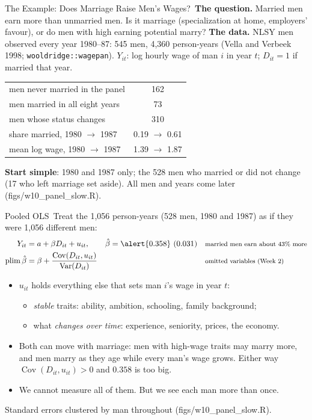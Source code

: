 \documentclass[aspectratio=169,11pt,xcolor=dvipsnames]{beamer}
\newcommand{\srcp}[1]{{\scriptsize\color{gray}(#1)}}
\DeclareMathOperator{\Cov}{Cov}
\DeclareMathOperator{\Var}{Var}
\DeclareMathOperator{\plim}{plim}
\newcommand{\core}{\,\raisebox{0.6pt}{\textcolor{corestar}{$\bigstar$}}}
\begin{document}
\begin{frame}{The Example: Does Marriage Raise Men's Wages?\core}
\textbf{The question.} Married men earn more than unmarried men. Is it marriage
(specialization at home, employers' favour), or do men with high earning potential marry?
\vskip3pt
\textbf{The data.} NLSY men observed every year 1980--87: 545 men, 4,360
person-years \srcp{Vella and Verbeek 1998; \texttt{wooldridge::wagepan}}.
$Y_{it}$: log hourly wage of man $i$ in year $t$; $D_{it} = 1$ if married that year.
\vskip3pt
\begin{center}\small
\renewcommand{\arraystretch}{1.1}
\begin{tabular}{@{}lc@{}}
\toprule
men never married in the panel & 162 \\
men married in all eight years & 73 \\
men whose status changes & 310 \\
\midrule
share married, 1980 $\to$ 1987 & 0.19 $\to$ 0.61 \\
mean log wage, 1980 $\to$ 1987 & 1.39 $\to$ 1.87 \\
\bottomrule
\end{tabular}
\end{center}
\textbf{Start simple}: 1980 and 1987 only; the 528 men who married or did not change
(17 who left marriage set aside). All men and years come later \srcp{figs/w10\_panel\_slow.R}.
\end{frame}

\begin{frame}{Pooled OLS\core}
Treat the 1,056 person-years (528 men, 1980 and 1987) as if they were 1,056 different men:
\begin{align*}
  Y_{it} &= a + \beta D_{it} + u_{it}, \qquad \hat\beta = \alert{0.358}\ (0.031)
   && \text{\footnotesize married men earn about 43\% more} \\
  \plim \hat\beta &= \beta + \frac{\Cov(D_{it}, u_{it})}{\Var(D_{it})}
   && \text{\footnotesize omitted variables (Week 2)}
\end{align*}
\begin{itemize}\itemsep3pt
  \item $u_{it}$ holds everything else that sets man $i$'s wage in year $t$:
  \begin{itemize}\itemsep1pt
    \item \emph{stable} traits: ability, ambition, schooling, family background;
    \item what \emph{changes over time}: experience, seniority, prices, the economy.
  \end{itemize}
  \item Both can move with marriage: men with high-wage traits may marry more, and
        men marry as they age while every man's wage grows. Either way
        $\Cov(D_{it}, u_{it}) > 0$ and $0.358$ is too big.
  \item We cannot measure all of them. But we see each man more than once.
\end{itemize}
{\footnotesize Standard errors clustered by man throughout \srcp{figs/w10\_panel\_slow.R}.}
\end{frame}
\end{document}
